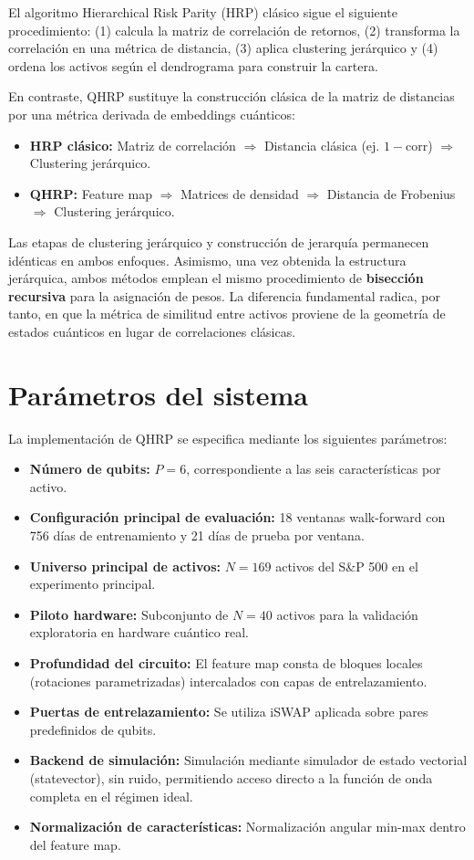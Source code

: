 El algoritmo Hierarchical Risk Parity (HRP) clásico sigue el siguiente procedimiento: (1) calcula la matriz de correlación de retornos, (2) transforma la correlación en una métrica de distancia, (3) aplica clustering jerárquico y (4) ordena los activos según el dendrograma para construir la cartera.

En contraste, QHRP sustituye la construcción clásica de la matriz de distancias por una métrica derivada de embeddings cuánticos:
\begin{itemize}
    \item \textbf{HRP clásico:} Matriz de correlación $\Rightarrow$ Distancia clásica (ej. $1 - \text{corr}$) $\Rightarrow$ Clustering jerárquico.
    \item \textbf{QHRP:} Feature map $\Rightarrow$ Matrices de densidad $\Rightarrow$ Distancia de Frobenius $\Rightarrow$ Clustering jerárquico.
\end{itemize}

Las etapas de clustering jerárquico y construcción de jerarquía permanecen idénticas en ambos enfoques. Asimismo, una vez obtenida la estructura jerárquica, ambos métodos emplean el mismo procedimiento de \textbf{bisección recursiva} para la asignación de pesos. La diferencia fundamental radica, por tanto, en que la métrica de similitud entre activos proviene de la geometría de estados cuánticos en lugar de correlaciones clásicas.

\section{Parámetros del sistema}
\label{sec:parametros_sistema}

La implementación de QHRP se especifica mediante los siguientes parámetros:

\begin{itemize}
    \item \textbf{Número de qubits:} $P = 6$, correspondiente a las seis características por activo.
    \item \textbf{Configuración principal de evaluación:} 18 ventanas walk-forward con 756 días de entrenamiento y 21 días de prueba por ventana.
    \item \textbf{Universo principal de activos:} $N = 169$ activos del S\&P 500 en el experimento principal.
    \item \textbf{Piloto hardware:} Subconjunto de $N = 40$ activos para la validación exploratoria en hardware cuántico real.
    \item \textbf{Profundidad del circuito:} El feature map consta de bloques locales (rotaciones parametrizadas) intercalados con capas de entrelazamiento.
    \item \textbf{Puertas de entrelazamiento:} Se utiliza iSWAP aplicada sobre pares predefinidos de qubits.
    \item \textbf{Backend de simulación:} Simulación mediante simulador de estado vectorial (statevector), sin ruido, permitiendo acceso directo a la función de onda completa en el régimen ideal.
    \item \textbf{Normalización de características:} Normalización angular min-max dentro del feature map.
\end{itemize}

